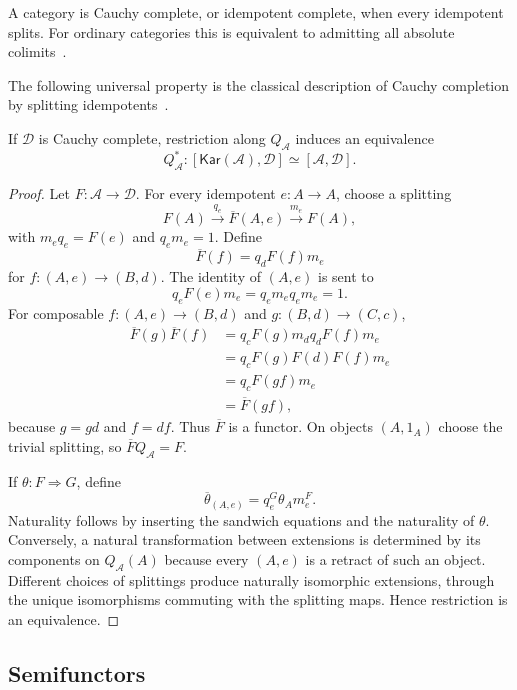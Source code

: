 \documentclass[runningheads,envcountsame]{llncs}
\newcommand{\Kar}{\mathsf{Kar}}
\begin{document}
A category is Cauchy complete, or idempotent complete, when every idempotent splits. For ordinary categories this is equivalent to admitting all absolute colimits~\cite{BorceuxDejean1986,Kelly1982,MacLane1998}.

The following universal property is the classical description of Cauchy completion by splitting idempotents~\cite{BorceuxDejean1986,Kelly1982,MacLane1998}.

\begin{theorem}
\label{thm:kar-up-app}
If $\mathcal D$ is Cauchy complete, restriction along $Q_\mathcal A$ induces an equivalence
$$
Q_\mathcal A^*:
[\Kar(\mathcal A),\mathcal D]
\simeq
[\mathcal A,\mathcal D].
$$
\end{theorem}

\begin{proof}
Let $F:\mathcal A\to\mathcal D$. For every idempotent $e:A\to A$, choose a splitting
$$
F(A)
\xrightarrow{q_e}
\overline F(A,e)
\xrightarrow{m_e}
F(A),
$$
with $m_eq_e=F(e)$ and $q_em_e=1$. Define
$$
\overline F(f)=q_dF(f)m_e
$$
for $f:(A,e)\to(B,d)$. The identity of $(A,e)$ is sent to
$$
q_eF(e)m_e
=
q_em_eq_em_e
=1.
$$
For composable $f:(A,e)\to(B,d)$ and $g:(B,d)\to(C,c)$,
$$
\begin{aligned}
\overline F(g)\overline F(f)
&=q_cF(g)m_dq_dF(f)m_e\\
&=q_cF(g)F(d)F(f)m_e\\
&=q_cF(gf)m_e\\
&=\overline F(gf),
\end{aligned}
$$
because $g=gd$ and $f=df$. Thus $\overline F$ is a functor. On objects $(A,1_A)$ choose the trivial splitting, so $\overline FQ_\mathcal A=F$.

If $\theta:F\Rightarrow G$, define
$$
\overline\theta_{(A,e)}=q_e^G\theta_A m_e^F.
$$
Naturality follows by inserting the sandwich equations and the naturality of $\theta$. Conversely, a natural transformation between extensions is determined by its components on $Q_\mathcal A(A)$ because every $(A,e)$ is a retract of such an object. Different choices of splittings produce naturally isomorphic extensions, through the unique isomorphisms commuting with the splitting maps. Hence restriction is an equivalence.
\end{proof}

\subsection{Semifunctors}
\end{document}
